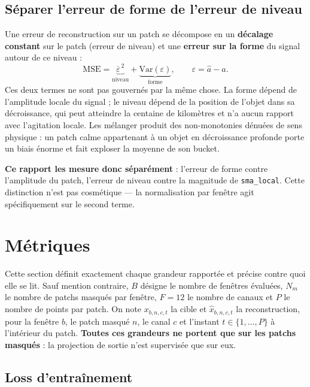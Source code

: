 \documentclass{article}
\begin{document}
\subsection{Séparer l'erreur de forme de l'erreur de niveau}

Une erreur de reconstruction sur un patch se décompose en un \textbf{décalage constant} sur le patch (erreur de niveau) et une \textbf{erreur sur la forme} du signal autour de ce niveau :
$$
\mathrm{MSE} = \underbrace{\overline{\varepsilon}^{\,2}}_{\text{niveau}} + \underbrace{\mathrm{Var}(\varepsilon)}_{\text{forme}}, \qquad \varepsilon = \hat{a} - a .
$$
Ces deux termes ne sont pas gouvernés par la même chose. La forme dépend de l'amplitude locale du signal ; le niveau dépend de la position de l'objet dans sa décroissance, qui peut atteindre la centaine de kilomètres et n'a aucun rapport avec l'agitation locale. Les mélanger produit des non-monotonies dénuées de sens physique : un patch calme appartenant à un objet en décroissance profonde porte un biais énorme et fait exploser la moyenne de son bucket.

\textbf{Ce rapport les mesure donc séparément} : l'erreur de forme contre l'amplitude du patch, l'erreur de niveau contre la magnitude de \texttt{sma\_local}. Cette distinction n'est pas cosmétique --- la normalisation par fenêtre agit spécifiquement sur le second terme.

\section{Métriques}

Cette section définit exactement chaque grandeur rapportée et précise contre quoi elle se lit. Sauf mention contraire, $B$ désigne le nombre de fenêtres évaluées, $N_m$ le nombre de patchs masqués par fenêtre, $F=12$ le nombre de canaux et $P$ le nombre de points par patch. On note $x_{b,n,c,t}$ la cible et $\hat{x}_{b,n,c,t}$ la reconstruction, pour la fenêtre $b$, le patch masqué $n$, le canal $c$ et l'instant $t \in \{1,\dots,P\}$ à l'intérieur du patch. \textbf{Toutes ces grandeurs ne portent que sur les patchs masqués} : la projection de sortie n'est supervisée que sur eux.

\subsection{Loss d'entraînement}
\end{document}
